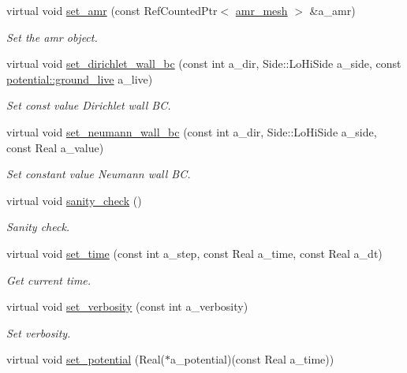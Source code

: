 \begin{DoxyCompactItemize}
virtual void \hyperlink{classpoisson__solver_af0ae8fe08122c5a81bbccdd6b504770a}{set\+\_\+amr} (const Ref\+Counted\+Ptr$<$ \hyperlink{classamr__mesh}{amr\+\_\+mesh} $>$ \&a\+\_\+amr)
\begin{DoxyCompactList}\small\item\em Set the amr object. \end{DoxyCompactList}\item 
virtual void \hyperlink{classpoisson__solver_a3eb31eae1d2751492ded67daf4ece936}{set\+\_\+dirichlet\+\_\+wall\+\_\+bc} (const int a\+\_\+dir, Side\+::\+Lo\+Hi\+Side a\+\_\+side, const \hyperlink{namespacepotential_a22249d745e66b412864d893590d05b21}{potential\+::ground\+\_\+live} a\+\_\+live)
\begin{DoxyCompactList}\small\item\em Set const value Dirichlet wall BC. \end{DoxyCompactList}\item 
virtual void \hyperlink{classpoisson__solver_ac887c3749a158b8c009ecad185c0b8e1}{set\+\_\+neumann\+\_\+wall\+\_\+bc} (const int a\+\_\+dir, Side\+::\+Lo\+Hi\+Side a\+\_\+side, const Real a\+\_\+value)
\begin{DoxyCompactList}\small\item\em Set constant value Neumann wall BC. \end{DoxyCompactList}\item 
virtual void \hyperlink{classpoisson__solver_a71a48787763db0f8a2ea691865afd155}{sanity\+\_\+check} ()
\begin{DoxyCompactList}\small\item\em Sanity check. \end{DoxyCompactList}\item 
virtual void \hyperlink{classpoisson__solver_a4bf20c0f40a055490ff259aa952376fa}{set\+\_\+time} (const int a\+\_\+step, const Real a\+\_\+time, const Real a\+\_\+dt)
\begin{DoxyCompactList}\small\item\em Get current time. \end{DoxyCompactList}\item 
virtual void \hyperlink{classpoisson__solver_a7bd5267969da5183ac08b9cc81748374}{set\+\_\+verbosity} (const int a\+\_\+verbosity)
\begin{DoxyCompactList}\small\item\em Set verbosity. \end{DoxyCompactList}\item 
virtual void \hyperlink{classpoisson__solver_add3fa02f69f339cd857dea12f8d1c39f}{set\+\_\+potential} (Real($\ast$a\+\_\+potential)(const Real a\+\_\+time))

\end{DoxyCompactItemize}
